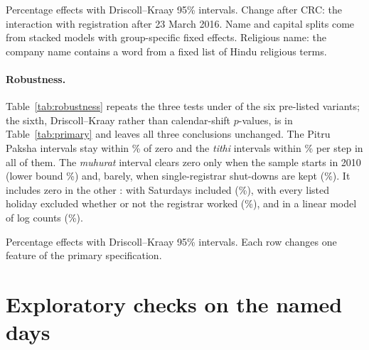 \documentclass[12pt,letterpaper]{article}
\newcommand{\tithi}{\textit{tithi}}
\newcommand{\muhurat}{\textit{muhurat}}
\begin{document}
\begin{table}[t]
\centering
\caption{Heterogeneity and placebo populations (secondary)}
\label{tab:heterogeneity}
\footnotesize

\par\medskip
\begin{minipage}{0.95\textwidth}\footnotesize
Percentage effects with Driscoll--Kraay 95\% intervals. Change after CRC: the interaction with registration after 23 March 2016. Name and capital splits come from stacked models with group-specific fixed effects. Religious name: the company name contains a word from a fixed list of Hindu religious terms.
\end{minipage}
\end{table}

\paragraph{Robustness.} Table~\ref{tab:robustness} repeats the three tests under \RobN{} of the six pre-listed variants; the sixth, Driscoll--Kraay rather than calendar-shift $p$-values, is in Table~\ref{tab:primary} and leaves all three conclusions unchanged. The Pitru Paksha intervals stay within \RobPOneMax\% of zero and the \tithi{} intervals within \RobPThreeMax\% per step in all of them. The \muhurat{} interval clears zero only when the sample starts in 2010 (lower bound \RobTenLo\%) and, barely, when single-registrar shut-downs are kept (\RobKeptLo\%). It includes zero in the other \RobPTwoInclZero: with Saturdays included (\RobSatPTwo\%), with every listed holiday excluded whether or not the registrar worked (\RobAllHolPTwo\%), and in a linear model of log counts (\RobOlsPTwo\%).

\begin{table}[t]
\centering
\caption{Pre-listed robustness checks}
\label{tab:robustness}
\footnotesize

\par\medskip
\begin{minipage}{0.95\textwidth}\footnotesize
Percentage effects with Driscoll--Kraay 95\% intervals. Each row changes one feature of the primary specification.
\end{minipage}
\end{table}

\section{Exploratory checks on the named days}
\end{document}
